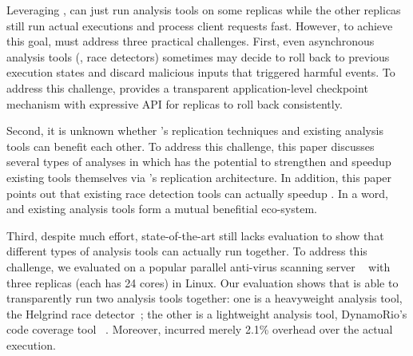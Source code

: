 


Leveraging \repbox, \xxx can just run analysis tools on some replicas while the other replicas 
still run actual executions and process client requests fast. However, to achieve this goal, 
\xxx must address three practical challenges. First, even asynchronous analysis tools (\eg, race detectors) 
sometimes may decide to roll back to previous execution states and discard 
malicious inputs that triggered harmful events. To address this challenge, 
\xxx provides a transparent application-level checkpoint mechanism 
with expressive API for replicas to roll back consistently.

Second, it is unknown whether \xxx's replication techniques and existing analysis tools can benefit 
each other. To address this challenge, this paper discusses several types of 
analyses in which \xxx has the potential to strengthen and speedup existing 
tools themselves via \xxx's replication architecture. In addition, 
this paper points out that existing race detection tools can actually speedup 
\xxx. In a word, \xxx and existing analysis tools form a mutual benefitial 
eco-system.

Third, despite much effort, state-of-the-art still lacks evaluation to show that different types of 
analysis tools can actually run together. To address this challenge, we 
evaluated \xxx on a popular parallel anti-virus 
scanning server \clamav~\cite{clamav} with three 
replicas (each has 24 cores) in Linux. Our evaluation shows that \xxx is able to transparently run two 
analysis tools together: one is a heavyweight analysis tool, the Helgrind race 
detector~\cite{valgrind:pldi}; the other is a lightweight analysis tool, 
DynamoRio's code coverage tool \drcov~\cite{dynamorio}. Moreover, \xxx incurred 
merely 2.1\% overhead over the actual execution.


